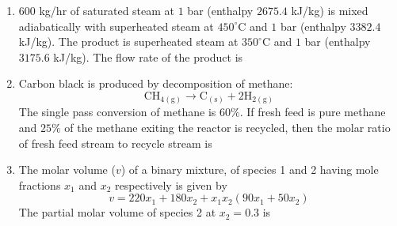 \documentclass[journal,12pt,onecolumn]{IEEEtran}
\theoremstyle{remark}
\begin{document}
\begin{enumerate}
\item $600$ kg/hr of saturated steam at $1$ bar (enthalpy $2675.4$ kJ/kg) is mixed adiabatically with superheated steam at $450^\circ\mathrm{C}$ and $1$ bar (enthalpy $3382.4$ kJ/kg). The product is superheated steam at $350^\circ\mathrm{C}$ and $1$ bar (enthalpy $3175.6$ kJ/kg). The flow rate of the product is
\hfill{}
\begin{enumerate}
\end{enumerate}

\item Carbon black is produced by decomposition of methane:
\[\mathrm{CH}_{4(\mathrm{g})} \rightarrow \mathrm{C}_{(\mathrm{s})} + 2 \mathrm{H}_{2(\mathrm{g})}\]
The single pass conversion of methane is $60\%$. If fresh feed is pure methane and $25\%$ of the methane exiting the reactor is recycled, then the molar ratio of fresh feed stream to recycle stream is
\hfill{}
\begin{enumerate}
\end{enumerate}

\item The molar volume ($v$) of a binary mixture, of species 1 and 2 having mole fractions $x_1$ and $x_2$ respectively is given by
\[
v = 220x_1 + 180x_2 + x_1 x_2 (90x_1 + 50x_2)
\]
The partial molar volume of species 2 at $x_2 = 0.3$ is  
\hfill{}
\begin{enumerate}
\end{enumerate}


\end{enumerate}
\end{document}
